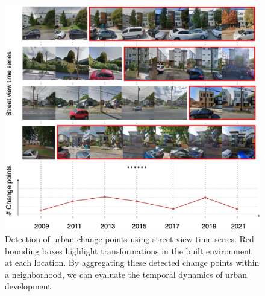 \begin{figure}[ht!]
    \centering
    \includegraphics[width=1.0\linewidth]{figure/main.png}
    \caption{Detection of urban change points using street view time series. Red bounding boxes highlight transformations in the built environment at each location. By aggregating these detected change points within a neighborhood, we can evaluate the temporal dynamics of urban development.}
    \label{fig:main}
\end{figure}

